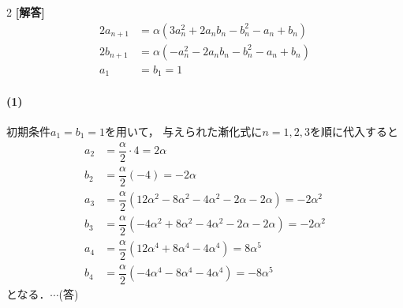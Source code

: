 \documentclass[../../main.tex]{subfiles}
\begin{document}
\setcounter{equation}{0}
\begin{oframed}
  
\end{oframed}
\setlength{\columnseprule}{0.4pt}
\begin{multicols}{2}
  {\bf [解答]}
  \begin{align}
    2a_{n+1} & = \alpha (3a_n^2 + 2a_n b_n - b_n^2 - a_n + b_n) \\
    2b_{n+1} & = \alpha (-a_n^2 - 2a_n b_n - b_n^2 - a_n + b_n) \\
    a_1      & = b_1 = 1
  \end{align}

  \paragraph{(1)}
  初期条件$a_1=b_1=1$を用いて，
  与えられた漸化式に$n=1,2,3$を順に代入すると
  \begin{align}
    a_2 & = \dfrac{\alpha}{2} \cdot 4 = 2\alpha                                                     \\
    b_2 & = \dfrac{\alpha}{2} (-4) = -2\alpha                                                       \\
    a_3 & = \dfrac{\alpha}{2} (12\alpha^2 - 8\alpha^2 - 4\alpha^2 - 2\alpha - 2\alpha) = -2\alpha^2 \\
    b_3 & = \dfrac{\alpha}{2} (-4\alpha^2 + 8\alpha^2 - 4\alpha^2 - 2\alpha - 2\alpha) = -2\alpha^2 \\
    a_4 & = \dfrac{\alpha}{2} (12\alpha^4 + 8\alpha^4 - 4\alpha^4) = 8\alpha^5                      \\
    b_4 & = \dfrac{\alpha}{2} (-4\alpha^4 - 8\alpha^4 - 4\alpha^4) = -8\alpha^5
  \end{align}
  となる．$\cdots$(答)


\end{multicols}
\end{document}
